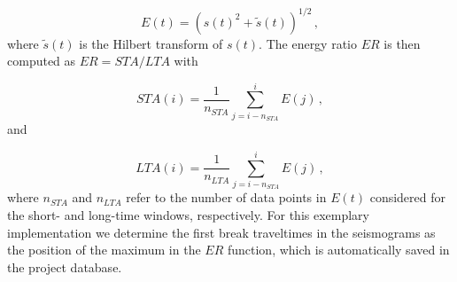 \documentclass[a4paper,fleqn]{cas-sc}
\begin{document}
\begin{equation}
	E(t)=\left(s\left(t\right)^2+\tilde{s}\left(t\right)\right)^{1/2}\,,
	\label{eq:envelope}
\end{equation}
where $\tilde{s}\left(t\right)$ is the Hilbert transform of $s\left(t\right)$. The energy ratio $ER$ is then computed as $ER=STA/LTA$ with

\begin{equation}
	STA\left(i\right)=\frac{1}{n_{STA}}\sum_{j=i-n_{STA}}^{i}E\left(j\right)\,,
	\label{eq:sta}
\end{equation}
and 

\begin{equation}
	LTA\left(i\right)=\frac{1}{n_{LTA}}\sum_{j=i-n_{STA}}^{i}E\left(j\right)\,,
	\label{eq:lta}
\end{equation}
where $n_{STA}$ and $n_{LTA}$ refer to the number of data points in $E\left(t\right)$ considered for the short- and long-time windows, respectively. For this exemplary implementation we determine the first break traveltimes in the seismograms as the position of the maximum in the $ER$ function, which is automatically saved in the project database. 
\end{document}
